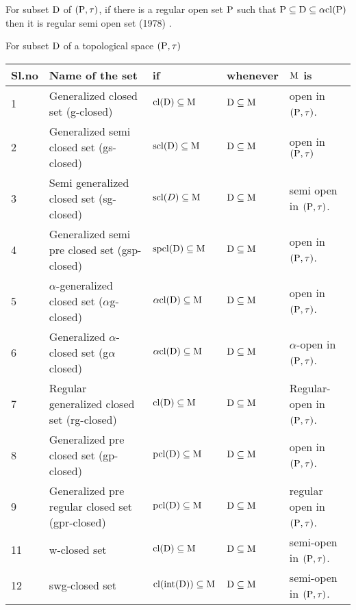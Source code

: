 \begin{dfn}\label{dfn1.2.6}
For subset $\mathrm{D}$ of $(\mathrm{P}, \tau)$, if there is a regular open set $\mathrm{P}$ such that $\mathrm{P} \subseteq \mathrm{D} \subseteq \alpha \mathrm{cl}(\mathrm{P})$ then it is regular semi open set (1978) \cite{Cameron}. 
\end{dfn}

\begin{dfn}\label{dfn1.2.7}
For subset $\mathrm{D}$ of a topological space $(\mathrm{P}, \tau)$ 
\end{dfn}

{\fontsize{10}{12}\selectfont
\begin{longtable}{|p{1cm}|>{\raggedright}p{5cm}|>{\centering}p{2.5cm}|>{\centering}p{1.7cm}|>{\centering}p{2.8cm}|}
\hline
\textbf{Sl.no} & \textbf{Name of the set} & \textbf{if} & \textbf{whenever} & {\boldmath $\mathrm{M}$} \textbf{is}\tabularnewline
\hline
1 & Generalized closed set (g-closed) \cite{Levine} & $\mathrm{cl}(\mathrm{D}) \subseteq \mathrm{M}$ & $\mathrm{D} \subseteq \mathrm{M}$ & open in $(\mathrm{P}, \tau)$.\tabularnewline
\hline
2 & Generalized semi closed set (gs-closed) \cite{Arya} & $\mathrm{scl}(\mathrm{D}) \subseteq \mathrm{M}$ & $\mathrm{D} \subseteq \mathrm{M}$ & open in $(\mathrm{P}, \tau)$\tabularnewline
\hline
3 & Semi generalized closed set (sg-closed) \cite{Bhattacharyya} & $\mathrm{scl}(D) \subseteq \mathrm{M}$ & $\mathrm{D} \subseteq \mathrm{M}$ & semi open in $(\mathrm{P}, \tau)$.\tabularnewline
\hline
4 & Generalized semi pre closed set (gsp-closed) \cite{Dontchev} & $\mathrm{spcl}(\mathrm{D}) \subseteq \mathrm{M}$ & $\mathrm{D} \subseteq \mathrm{M}$ & open in $(\mathrm{P}, \tau)$.\tabularnewline
\hline
5 & $\alpha$-generalized closed set ($\alpha$g-closed) \cite{Maki3} & $\alpha\mathrm{cl}(\mathrm{D}) \subseteq \mathrm{M}$ & $\mathrm{D}\subseteq\mathrm{M}$ & open in $(\mathrm{P}, \tau)$.\tabularnewline
\hline
6 & Generalized $\alpha$-closed set (g$\alpha$ closed) \cite{Maki3} & $\alpha\mathrm{cl}(\mathrm{D}) \subseteq \mathrm{M}$ & $\mathrm{D}\subseteq\mathrm{M}$ & $\alpha$-open in $(\mathrm{P}, \tau)$.\tabularnewline
\hline
7 & Regular generalized closed set (rg-closed) \cite{Palaniappan} & $\mathrm{cl}(\mathrm{D}) \subseteq \mathrm{M}$ & $\mathrm{D} \subseteq \mathrm{M}$ & Regular-open in $(\mathrm{P}, \tau)$.\tabularnewline
\hline
8 & Generalized pre closed set (gp-closed) \cite{Noiri1} & $\mathrm{pcl}(\mathrm{D}) \subseteq \mathrm{M}$ & $\mathrm{D} \subseteq \mathrm{M}$ & open in $(\mathrm{P}, \tau)$.\tabularnewline
\hline
9 & Generalized pre regular closed set (gpr-closed) \cite{Gnanambal} & $\mathrm{pcl}(\mathrm{D}) \subseteq \mathrm{M}$ & $\mathrm{D} \subseteq \mathrm{M}$ & regular open in $(\mathrm{P}, \tau)$.\tabularnewline
\hline
11 & w-closed set \cite{Sheik} & $\mathrm{cl}(\mathrm{D}) \subseteq \mathrm{M}$ & $\mathrm{D} \subseteq \mathrm{M}$ & semi-open in $(\mathrm{P}, \tau)$.\tabularnewline
\hline
12 & swg-closed set \cite{Nagaveni6} & $\mathrm{cl}(\mbox{int}(\mathrm{D})) \subseteq \mathrm{M}$ & $\mathrm{D} \subseteq \mathrm{M}$ & semi-open in $(\mathrm{P}, \tau)$.\tabularnewline

\end{longtable}}
